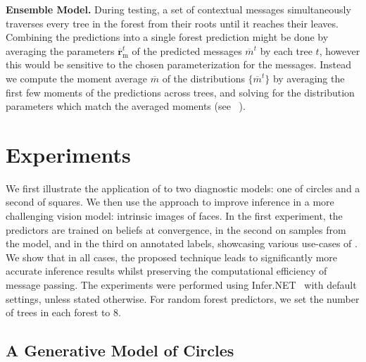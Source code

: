 \textbf{Ensemble Model.} During testing, a set of contextual messages simultaneously traverses every tree in the forest from their roots until it reaches their leaves. Combining the predictions into a single forest prediction might be done by averaging the parameters $\overline{\mathbf{r}}_\textrm{m}^t$ of the predicted messages $\overline{m}^t$ by each tree $t$, however this would be sensitive to the chosen parameterization for the messages. Instead we compute the moment average $\overline{m}$ of the distributions $\{ \overline{m}^t \}$ by averaging the first few moments of the predictions across trees, and solving for the distribution parameters which match the averaged moments (see \eg~\cite{Grosse2013}).

\section{Experiments}
\label{sec:experiments-chap4}

We first illustrate the application of \MTD to two diagnostic models: one of circles and a second of squares. We then use the approach to improve inference in a more challenging vision model: intrinsic images of faces. In the first experiment, the predictors are trained on beliefs at convergence, in the second on samples from the model, and in the third on annotated labels, showcasing various use-cases of \MTD. We show that in all cases, the proposed technique leads to significantly more accurate inference results whilst preserving the computational efficiency of message passing. The experiments were performed using Infer.NET~\cite{InferNET2012} with default settings, unless stated otherwise. For random forest predictors, we set the number of trees in each forest to 8.

\subsection{A Generative Model of Circles}
\label{sec:circle}

